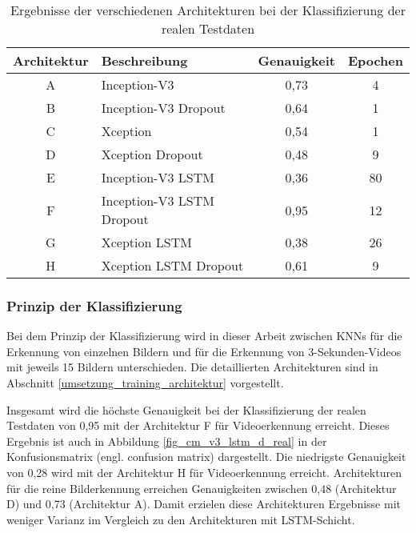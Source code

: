 \begin{table}[h]
\small
\centering
\def\arraystretch{1.4}
\begin{tabular}{c p{3cm} c c}
\textbf{Architektur} & \textbf{Beschreibung} & \textbf{Genauigkeit} & \textbf{Epochen} \\
\hline
A & Inception-V3 & 0,73 & 4 \\
\hline
B & Inception-V3 \newline Dropout & 0,64 & 1 \\
\hline
C & Xception & 0,54 & 1 \\
\hline
D & Xception \newline Dropout & 0,48 & 9 \\
\hline 
E & Inception-V3 \newline LSTM & 0,36 & 80 \\
\hline
F & Inception-V3 \newline LSTM \newline Dropout & 0,95 & 12 \\
\hline
G & Xception \newline LSTM & 0,38 & 26 \\
\hline
H & Xception \newline LSTM \newline Dropout & 0,61 & 9 \\
\hline
\end{tabular}
\caption{Ergebnisse der verschiedenen Architekturen bei der Klassifizierung der realen Testdaten}
\label{tab_ergebnis_real}
\end{table}

\subsubsection{Prinzip der Klassifizierung}

Bei dem Prinzip der Klassifizierung wird in dieser Arbeit zwischen \acp{KNN} für die Erkennung von einzelnen Bildern und für die Erkennung von 3-Sekunden-Videos mit jeweils 15 Bildern unterschieden. Die detaillierten Architekturen sind in Abschnitt \ref{umsetzung_training_architektur} vorgestellt.

Insgesamt wird die höchste Genauigkeit bei der Klassifizierung der realen Testdaten von 0,95 mit der Architektur F für Videoerkennung erreicht. Dieses Ergebnis ist auch in Abbildung \ref{fig_cm_v3_lstm_d_real} in der Konfusionsmatrix (engl. confusion matrix) dargestellt. Die niedrigste Genauigkeit von 0,28 wird mit der Architektur H für Videoerkennung erreicht. Architekturen für die reine Bilderkennung erreichen Genauigkeiten zwischen 0,48 (Architektur D) und 0,73 (Architektur A). Damit erzielen diese Architekturen Ergebnisse mit weniger Varianz im Vergleich zu den Architekturen mit \ac{LSTM}-Schicht.

